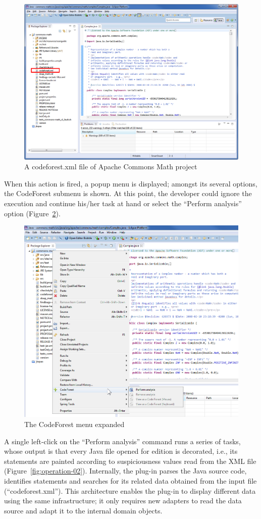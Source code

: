 \begin{figure}[h!]
\centerline{\includegraphics[width=.8\linewidth]{figures/commons_math_complex_00}}
\caption{A codeforest.xml file of Apache Commons Math
project}\label{fig:operation-00}
\end{figure}

When this action is fired, a popup menu is displayed; amongst its several
options, the CodeForest submenu is shown. At this point, the developer could
ignore the execution and continue his/her task at hand or select the ``Perform
analysis'' option (Figure~\ref{fig:operation-01}).

\begin{figure}[h!]
\centerline{\includegraphics[width=.8\linewidth]{figures/commons_math_complex_01_perf_analysis}}
\caption{The CodeForest menu expanded}\label{fig:operation-01}
\end{figure}

A single left-click on the ``Perform analysis'' command runs a series of tasks,
whose output is that every Java file opened for edition is decorated, i.e., its
statements are painted according to suspiciousness values read from the XML file
(Figure~\ref{fig:operation-02}).
Internally, the plug-in parses the Java source code, identifies statements and
searches for its related data obtained from the input file (``codeforest.xml''). This architecture
enables the plug-in to display different data using the same infrastructure; it
only requires new adapters to read the data source and adapt it to the internal
domain objects.

